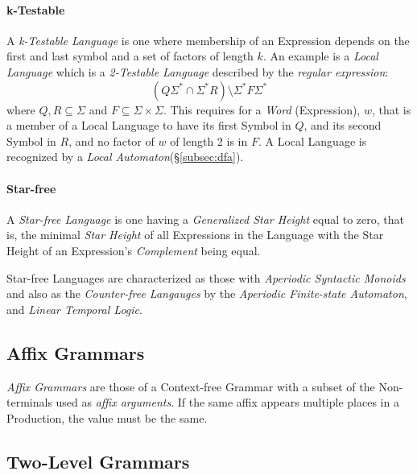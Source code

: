 \documentclass{article}
\begin{document}
\paragraph{k-Testable}\label{subsec:k_testable}
A \emph{k-Testable Language} is one where membership of an Expression
depends on the first and last symbol and a set of factors of length
$k$. An example is a \emph{Local Language} which is a \emph{2-Testable
  Language} described by the \emph{regular expression}:
\[
    (Q\Sigma^* \cap \Sigma^*R)\setminus\Sigma^*F\Sigma^*
\]
where $Q,R \subseteq \Sigma$ and $F \subseteq \Sigma \times
\Sigma$. This requires for a \emph{Word} (Expression), $w$, that is a
member of a Local Language to have its first Symbol in $Q$, and its
second Symbol in $R$, and no factor of $w$ of length 2 is in $F$. A
Local Language is recognized by a \emph{Local
  Automaton}(\S\ref{subsec:dfa}).

\paragraph{Star-free}
A \emph{Star-free Language} is one having a \emph{Generalized Star
  Height} equal to zero, that is, the minimal \emph{Star Height} of
all Expressions in the Language with the Star Height of an
Expression's \emph{Complement} being equal.

Star-free Languages are characterized as those with \emph{Aperiodic
  Syntactic Monoids}\cite{schutzenberger65} and also as the
\emph{Counter-free Langauges}\cite{mcnaughton-papert71} by the
\emph{Aperiodic Finite-state Automaton}, and \emph{Linear Temporal
  Logic}. %

\subsection{Affix Grammars}

\emph{Affix Grammars} are those of a Context-free Grammar with a
subset of the Non-terminals used as \emph{affix arguments}. If the
same affix appears multiple places in a Production, the value must be
the same.

\subsection{Two-Level Grammars}
\end{document}
